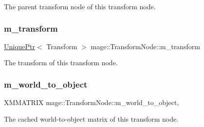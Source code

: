 The parent transform node of this transform node. \hypertarget{classmage_1_1_transform_node_ac601e39377f706442da334e040adaab3}{}\label{classmage_1_1_transform_node_ac601e39377f706442da334e040adaab3} 
\subsubsection{\texorpdfstring{m\+\_\+transform}{m\_transform}}
{\footnotesize\ttfamily \hyperlink{namespacemage_a8c307fbcc33bce9b7f2aa4c26c3b95cf}{Unique\+Ptr}$<$ Transform $>$ mage\+::\+Transform\+Node\+::m\+\_\+transform\hspace{0.3cm}{\ttfamily [private]}}

The transform of this transform node. \hypertarget{classmage_1_1_transform_node_ade413fc9a980ce8e1191c17f94f25e3f}{}\label{classmage_1_1_transform_node_ade413fc9a980ce8e1191c17f94f25e3f} 
\subsubsection{\texorpdfstring{m\+\_\+world\+\_\+to\+\_\+object}{m\_world\_to\_object}}
{\footnotesize\ttfamily X\+M\+M\+A\+T\+R\+IX mage\+::\+Transform\+Node\+::m\+\_\+world\+\_\+to\+\_\+object\hspace{0.3cm}{\ttfamily [mutable]}, {\ttfamily [private]}}

The cached world-\/to-\/object matrix of this transform node. 